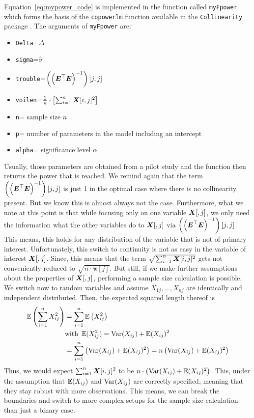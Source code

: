 \documentclass[11pt,a4paper,twoside]{book}\usepackage[]{graphicx}\usepackage[]{xcolor}
\begin{document}
Equation~\eqref{eq:mypower_code} is implemented in the function called \texttt{myFpower} which forms the basis of the \texttt{copowerlm} function available in the \texttt{Collinearity} package \citep{Collinearity}. The arguments of \texttt{myFpower} are:
\begin{multicols}{2}
\begin{itemize}
\item \texttt{Delta}=$\Delta$
\item \texttt{sigma}=$\hat\sigma$
\item \texttt{trouble}=$\left(\left({\boldsymbol{E}}^\top{\boldsymbol{E}}\right)^{-1}\right)[j,j]$
\item \texttt{voilen}=$\frac{1}{n}\cdot\left[\sum_{i=1}^{n}{\boldsymbol{X}}[i,j]^2\right]$
\item \texttt{n}= sample size $n$
\item \texttt{p}= number of parameters in the model including an intercept
\item \texttt{alpha}= significance level $\alpha$
\end{itemize}
\end{multicols}
Usually, those parameters are obtained from a pilot study and the function then returns the power that is reached. We remind again that the term $\left(\left({\boldsymbol{E}}^\top{\boldsymbol{E}}\right)^{-1}\right)[j,j]$ is just 1 in the optimal case where there is no collinearity present. But we know this is almost always not the case.
Furthermore, what we note at this point is that while focusing only on one variable ${\boldsymbol{X}}[,j]$, we only need the information what the other variables do to ${\boldsymbol{X}}[,j]$ via $\left(\left({\boldsymbol{E}}^\top{\boldsymbol{E}}\right)^{-1}\right)[j,j]$. This means, this holds for any distribution of the variable that is not of primary interest. Unfortunately, this switch to continuity is not as easy in the variable of interest ${\boldsymbol{X}}[,j]$. Since, this means that the term $\sqrt{\sum_{i=1}^{n}{\boldsymbol{X}}[i,j]^2}$ gets not conveniently reduced to $\sqrt{n\cdot \boldsymbol{\pi}[j] }$. But still, if we make further assumptions about the properties of ${\boldsymbol{X}}[,j]$, performing a sample size calculation is possible. We switch now to random variables and assume $X_{1j},\dots,X_{nj}$ are identically and independent distributed. Then, the expected squared length thereof is
\begin{align*}
\operatorname{\mathbb{E}}\left(\sum_{i=1}^{n}X_{ij}^2\right)&=\sum_{i=1}^{n}\operatorname{\mathbb{E}}\left(X_{ij}^2\right)\\
&\text{with } \operatorname{\mathbb{E}}(X_{ij}^2)=\operatorname{Var}(X_{ij})+\operatorname{\mathbb{E}}(X_{ij})^2\\
&=\sum_{i=1}^{n}\left(\operatorname{Var}(X_{ij})+\operatorname{\mathbb{E}}(X_{ij})^2\right)=n\left(\operatorname{Var}(X_{ij})+\operatorname{\mathbb{E}}(X_{ij})^2\right)
\end{align*}
Thus, we would expect $\sum_{i=1}^{n}{\boldsymbol{X}}[i,j]^2$ to be $n\cdot\left(\operatorname{Var}(X_{ij})+\operatorname{\mathbb{E}}(X_{ij})^2\right)$. This, under the assumption that $\operatorname{\mathbb{E}}(X_{ij})$ and $\operatorname{Var}(X_{ij})$ are correctly specified, meaning that they stay robust with more observations. This means, we can break the boundaries and switch to more complex setups for the sample size calculation than just a binary case.
\end{document}

